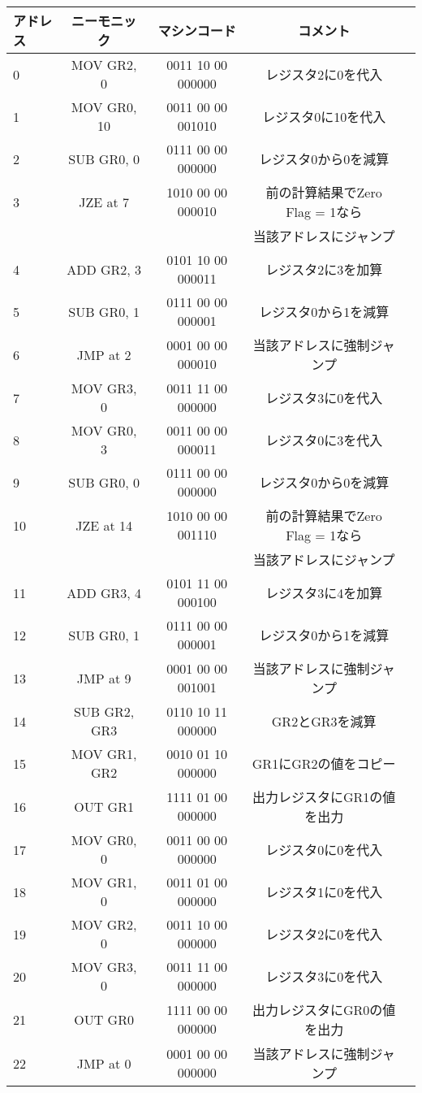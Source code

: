 \documentclass[lualatex,js=standard,hiresbb,openany]{bxjsarticle}
\begin{document}

\begin{table}[H]
  \begin{center}
   \begin{tabular}{lcccc}\hline
      アドレス & ニーモニック & マシンコード & コメント\\
      \hline \hline
      0 & MOV GR2, 0    & 0011 10 00 000000 & レジスタ2に0を代入\\
      1 & MOV GR0, 10   & 0011 00 00 001010 & レジスタ0に10を代入\\
      2 & SUB GR0, 0    & 0111 00 00 000000 & レジスタ0から0を減算\\
      3 & JZE at 7      & 1010 00 00 000010 & 前の計算結果でZero Flag = 1なら\\ &&&当該アドレスにジャンプ\\
      4 & ADD GR2, 3    & 0101 10 00 000011 & レジスタ2に3を加算\\
      5 & SUB GR0, 1    & 0111 00 00 000001 & レジスタ0から1を減算\\
      6 & JMP at 2      & 0001 00 00 000010 & 当該アドレスに強制ジャンプ\\
      7 & MOV GR3, 0    & 0011 11 00 000000 & レジスタ3に0を代入\\
      8 & MOV GR0, 3    & 0011 00 00 000011 & レジスタ0に3を代入\\
      9 & SUB GR0, 0    & 0111 00 00 000000 & レジスタ0から0を減算\\
     10 & JZE at 14     & 1010 00 00 001110 & 前の計算結果でZero Flag = 1なら\\ &&&当該アドレスにジャンプ\\
     11 & ADD GR3, 4    & 0101 11 00 000100 & レジスタ3に4を加算\\
     12 & SUB GR0, 1    & 0111 00 00 000001 & レジスタ0から1を減算\\
     13 & JMP at 9      & 0001 00 00 001001 & 当該アドレスに強制ジャンプ\\
     14 & SUB GR2, GR3  & 0110 10 11 000000 & GR2とGR3を減算 \\
     15 & MOV GR1, GR2  & 0010 01 10 000000 & GR1にGR2の値をコピー\\
     16 & OUT GR1       & 1111 01 00 000000 & 出力レジスタにGR1の値を出力\\
     17 & MOV GR0, 0    & 0011 00 00 000000 & レジスタ0に0を代入\\
     18 & MOV GR1, 0    & 0011 01 00 000000 & レジスタ1に0を代入\\
     19 & MOV GR2, 0    & 0011 10 00 000000 & レジスタ2に0を代入\\
     20 & MOV GR3, 0    & 0011 11 00 000000 & レジスタ3に0を代入\\
     21 & OUT GR0       & 1111 00 00 000000 & 出力レジスタにGR0の値を出力\\
     22 & JMP at 0      & 0001 00 00 000000 & 当該アドレスに強制ジャンプ\\
   


\end{tabular}
\end{center}
\end{table}
\end{document}
